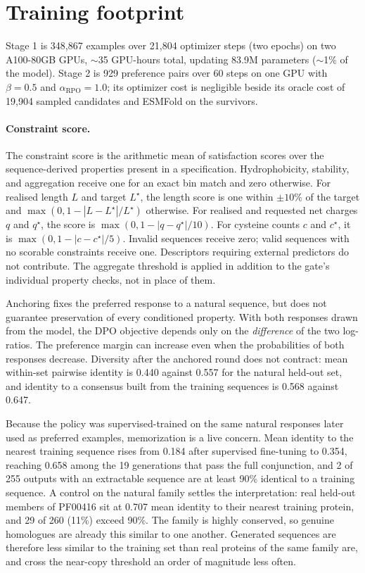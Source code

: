 \documentclass{article} %
\newcommand{\pct}{\%}
\begin{document}
\section{Training footprint}\label{app:compute}
Stage 1 is 348{,}867 examples over 21{,}804 optimizer steps (two epochs) on two
A100-80GB GPUs, $\sim$35 GPU-hours total, updating 83.9M
parameters ($\sim$1\pct{} of the model). Stage 2 is 929 preference pairs over 60
steps on one GPU with $\beta = 0.5$ and $\alpha_{\text{RPO}} = 1.0$; its optimizer cost is negligible beside its oracle cost of 19{,}904 sampled candidates and ESMFold on the survivors.
\paragraph{Constraint score.}
The constraint score is the arithmetic mean of satisfaction scores over the sequence-derived properties present in a specification. Hydrophobicity, stability, and aggregation receive one for an exact bin match and zero otherwise. For realised length $L$ and target $L^\star$, the length score is one within $\pm10\%$ of the target and $\max(0,1-|L-L^\star|/L^\star)$ otherwise. For realised and requested net charges $q$ and $q^\star$, the score is $\max(0,1-|q-q^\star|/10)$. For cysteine counts $c$ and $c^\star$, it is
$\max(0,1-|c-c^\star|/5)$. Invalid sequences receive zero; valid sequences with no scorable constraints receive one. Descriptors requiring external predictors do not contribute. The aggregate threshold is applied in addition to the gate's individual property checks, not in place of them.

Anchoring fixes the preferred response to a natural sequence, but does not guarantee preservation of every conditioned property. With both responses drawn from the model, the DPO objective depends only on the \emph{difference} of the two log-ratios. 
The preference margin can increase even when the probabilities of both responses decrease. Diversity after the anchored round does not contract: mean within-set pairwise identity is 0.440 against 0.557 for the natural held-out set, and identity to a consensus built from the training sequences is 0.568 against 0.647.

Because the policy was supervised-trained on the same natural responses later used as preferred examples, memorization is a live concern. Mean identity to the nearest training sequence rises from 0.184 after supervised fine-tuning to 0.354, reaching 0.658 among the 19 generations that pass the full conjunction, and 2 of 255 outputs with an extractable sequence are at least 90\pct{} identical to a training sequence. A control on the natural family settles the interpretation: real held-out members of PF00416 sit at 0.707 mean identity to their nearest training protein, and 29 of 260 (11\pct) exceed 90\pct. The family is highly conserved, so genuine homologues are already this similar to one another. Generated sequences are therefore less similar to the training set than real proteins of the same family are, and cross the near-copy threshold an order of magnitude less often.
\end{document}
